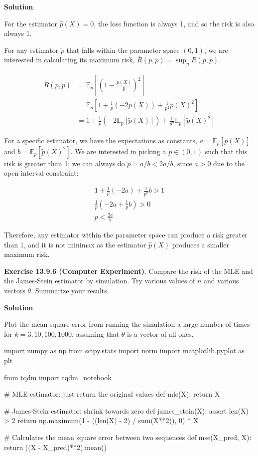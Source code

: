 \textbf{Solution}.

For the estimator \(\hat{p}(X) = 0\), the loss function is always 1, and
so the risk is also always 1.

For any estimator \(\tilde{p}\) that falls within the parameter space
\((0, 1)\), we are interested in calculating its maximum risk,
\(\overline{R}(p, \tilde{p}) = \sup_p R(p, \tilde{p})\).

\begin{align*}
R(p, \tilde{p}) &= \mathbb{E}_p \left[\left(1 - \frac{\tilde{p}(X)}{p} \right)^{2}\right]\\
&=\mathbb{E}_p \left[1 + \frac{1}{p} (-2 \tilde{p}(X)) + \frac{1}{p^{2}} \tilde{p}(X)^{2} \right] \\
&= 1 + \frac{1}{p} (-2 \mathbb{E}_p[\tilde{p}(X)]) + \frac{1}{p^{2}} \mathbb{E}_p[\tilde{p}(X)^{2}]
\end{align*}

For a specific estimator, we have the expectations as constants,
\(a = \mathbb{E}_p[\tilde{p}(X)]\) and
\(b = \mathbb{E}_p[\tilde{p}(X)^{2}]\). We are interested in picking a
\(p \in (0, 1)\) such that this risk is greater than 1; we can always do
\(p = a / b < 2a / b\), since \(a > 0\) due to the open interval
constraint:

\begin{align*}
1 + \frac{1}{p} (-2a) + \frac{1}{p^{2}} b > 1 \\
\frac{1}{p} \left(-2a + \frac{1}{p} b \right) > 0 \\
p < \frac{2a}{b}
\end{align*}

Therefore, any estimator within the parameter space can produce a risk
greater than 1, and it is not minimax as the estimator \(\hat{p}(X)\)
produces a smaller maximum risk.

\textbf{Exercise 13.9.6 (Computer Experiment)}. Compare the risk of the
MLE and the James-Stein estimator by simulation. Try various values of
\(n\) and various vectors \(\theta\). Summarize your results.

\textbf{Solution}.

Plot the mean square error from running the simulation a large
number of times for \(k = 3, 10, 100, 1000\), assuming that \(\theta\)
is a vector of all ones.

\begin{python}
import numpy as np
from scipy.stats import norm
import matplotlib.pyplot as plt

from tqdm import tqdm_{n}otebook


# MLE estimator: just return the original values
def mle(X):
    return X

# James-Stein estimator: shrink towards zero
def james_stein(X):
    assert len(X) > 2
    return np.maximum(1 - ((len(X) - 2) / sum(X**2)), 0) * X

# Calculates the mean square error between two sequences
def mse(X_pred, X):
    return ((X - X_pred)**2).mean()
\end{python}

